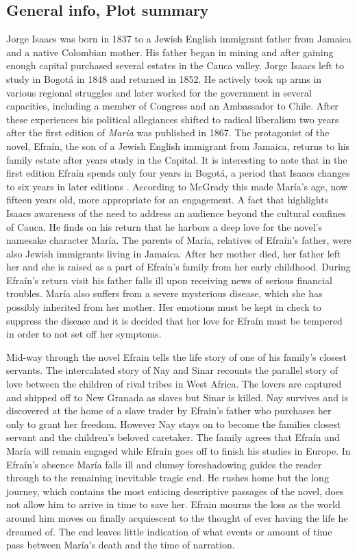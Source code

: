 \documentclass[12pt]{report}
\begin{document}
\subsection{General info, Plot summary}
Jorge Isaacs was born in 1837 to a Jewish English immigrant father from Jamaica and a native Colombian mother. His father began in mining and after gaining enough capital purchased several estates in the Cauca valley. Jorge Isaacs left to study in Bogotá in 1848 and returned in 1852. He actively took up arms in various regional struggles and later worked for the government in several capacities, including a member of Congress and an Ambassador to Chile. After these experiences his political allegiances shifted to radical liberalism two years after the first edition of \textit{Maria} was published in 1867. 
The protagonist of the novel, Efraín, the son of a Jewish English immigrant from Jamaica, returns to his family estate after years study in the Capital.
It is interesting to note that in the first edition Efraín spends only four years in Bogotá, a period that Isaacs changes to six years in later editions \autocite[67]{Isaacs2012}. According to McGrady this made María's age, now fifteen years old, more appropriate for an engagement. A fact that highlights Isaacs awareness of the need to address an audience beyond the cultural confines of Cauca.
He finds on his return that he harbors a deep love for the novel's namesake character María.
The parents of María, relatives of Efraín's father, were also Jewish immigrants living in Jamaica.
After her mother died, her father left her and she is raised as a part of Efraín's family from her early childhood.
During Efraín's return visit his father falls ill upon receiving news of serious financial troubles.
María also suffers from a severe mysterious disease, which she has possibly inherited from her mother.
Her emotions must be kept in check to suppress the disease and it is decided that her love for Efraín must be tempered in order to not set off her symptoms.


Mid-way through the novel Efrain tells the life story of one of his family’s closest servants.
The intercalated story of Nay and Sinar recounts the parallel story of love between the children of rival tribes in West Africa.
The lovers are captured and shipped off to New Granada as slaves but Sinar is killed.
Nay survives and is discovered at the home of a slave trader by Efrain’s father who purchases her only to grant her freedom.
However Nay stays on to become the families closest servant and the children’s beloved caretaker.
The family agrees that Efraín and María will remain engaged while Efraín goes off to finish his studies in Europe.
In Efraín's absence María falls ill and clumsy foreshadowing guides the reader through to the remaining inevitable tragic end.
He rushes home but the long journey, which contains the most enticing descriptive passages of the novel, does not allow him to arrive in time to save her.
Efrain mourns the loss as the world around him moves on finally acquiescent to the thought of ever having the life he dreamed of.
The end leaves little indication of what events or amount of time pass between María's death and the time of narration.
\end{document}
